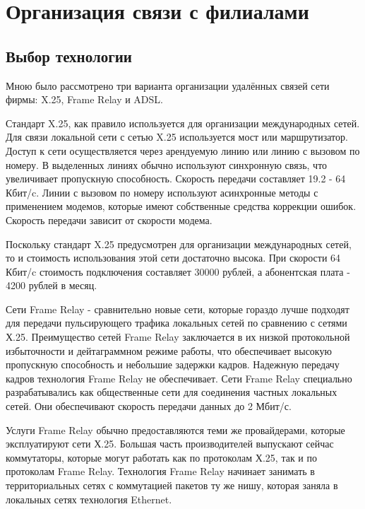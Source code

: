 \newpage

\section{Организация связи с филиалами}

\subsection{Выбор технологии}

Мною было рассмотрено три варианта организации удалённых связей сети фирмы: X.25, Frame Relay и ADSL.\par\bigskip

Стандарт X.25, как правило используется для организации международных сетей. Для связи локальной сети с сетью X.25 используется мост или маршрутизатор. Доступ к сети осуществляется через арендуемую линию или линию с вызовом по номеру. В выделенных линиях обычно используют синхронную связь, что увеличивает пропускную способность. Скорость передачи составляет 19.2 - 64 Кбит/c. Линии с вызовом по номеру используют асинхронные методы с применением модемов, которые имеют собственные средства коррекции ошибок. Скорость передачи зависит от скорости модема.\par\bigskip

Поскольку стандарт X.25 предусмотрен для организации международных сетей, то и стоимость использования этой сети достаточно высока. При скорости 64 Кбит/c стоимость подключения составляет 30000 рублей, а абонентская плата - 4200 рублей в месяц.\par\bigskip

Сети Frame Relay - сравнительно новые сети, которые гораздо лучше подходят для передачи пульсирующего трафика локальных сетей по сравнению с сетями Х.25. Преимущество сетей Frame Relay заключается в их низкой протокольной избыточности и дейтаграммном режиме работы, что обеспечивает высокую пропускную способность и небольшие задержки кадров. Надежную передачу кадров технология Frame Relay не обеспечивает. Сети Frame Relay специально разрабатывались как общественные сети для соединения частных локальных сетей. Они обеспечивают скорость передачи данных до 2 Мбит/с.\par\bigskip

Услуги Frame Relay обычно предоставляются теми же провайдерами, которые эксплуатируют сети Х.25. Большая часть производителей выпускают сейчас коммутаторы, которые могут работать как по протоколам Х.25, так и по протоколам Frame Relay. Технология Frame Relay начинает занимать в территориальных сетях с коммутацией пакетов ту же нишу, которая заняла в локальных сетях технология Ethernet.\par\bigskip

